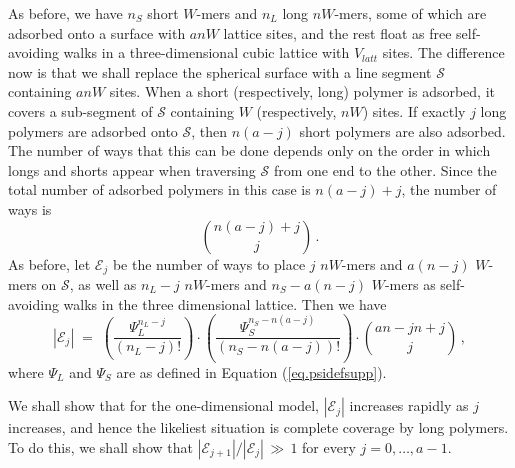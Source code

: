 \documentclass[journal=mamobx,manuscript=article]{achemso}
\begin{document}
As before, we have $n_S$ short $W$-mers and $n_L$ long $nW$-mers, some of which are adsorbed 
onto a surface with $anW$ lattice sites, and the rest float as free self-avoiding walks 
in a three-dimensional cubic lattice with  $V_{latt}$ sites.  
The difference now is that we shall replace the spherical surface with a line segment
$\mathcal{S}$ containing $anW$ sites.  When a short (respectively, long) polymer is adsorbed, it covers a 
sub-segment of $\mathcal{S}$ containing $W$ (respectively, $nW$) sites.
If exactly $j$ long polymers are adsorbed onto $\mathcal{S}$, then $n(a-j)$ short polymers are
also adsorbed.  The number of ways that this can be done depends only on the order in which 
longs and shorts appear when traversing $\mathcal{S}$ from one end to the other.  Since the total 
number of adsorbed polymers in this case is $n(a-j)+j$, the number of ways is 
\[      \binom{n(a-j)+j}{j}   \,.  \]
As before, let $\mathcal{E}_j$ be the number of ways to place $j$ $nW$-mers and $a(n-j)$ $W$-mers on 
$\mathcal{S}$, as well as $n_L-j$ $nW$-mers and $n_S-a(n-j)$ $W$-mers as self-avoiding walks 
in the three dimensional lattice.  Then we have 
\begin{equation}
   \label{eq.1dE}
    |\mathcal{E}_j| \;=\;  \left(\frac{\Psi_L^{n_{L}-j}}{(n_L-j)!}\right)\cdot\left(\frac{\Psi_S^{n_S-n(a-j)}}{
    (n_S-n(a-j))!}\right) \cdot\binom{an-jn+j}{j}   \,,
\end{equation}
where 
$\Psi_L$ and $\Psi_S$ are as defined in Equation (\ref{eq.psidefsupp}).

We shall show that for the one-dimensional model, $|\mathcal{E}_j|$ increases rapidly as $j$ increases,
and hence the likeliest situation is complete coverage by long polymers.  To do this, we shall show that
$|\mathcal{E}_{j+1}|/|\mathcal{E}_j| \,\gg\,1$ for every $j=0,\ldots,a-1$.
\end{document}
